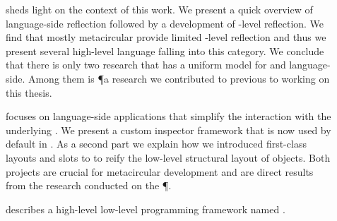 \begin{description}

\item[] sheds light on the context of this work.
	We present a quick overview of language-side reflection followed by a development of \VM-level reflection.
	We find that mostly metacircular \VMs provide limited \VM-level reflection and thus we present several high-level language \VMs falling into this category.
	We conclude that there is only two research \VM that has a uniform model for \VM and language-side.
	Among them is \P a research \ST \VM we contributed to previous to working on this thesis.

\item[] focuses on language-side applications that simplify the interaction with the underlying \VM.
	We present a custom inspector framework that is now used by default in \PH.
	As a second part we explain how we introduced first-class layouts and slots to \PH to reify the low-level structural layout of objects.
	Both projects are crucial for metacircular \VM development and are direct results from the research conducted on the \P \VM.

\item[] describes a high-level low-level programming framework named \B.
	\B 
	\\

\item[]
	\\
	\\

\item[]
	\\
	\\

\item[]
	\\
	\\
	\\

\item[]

\end{description}


